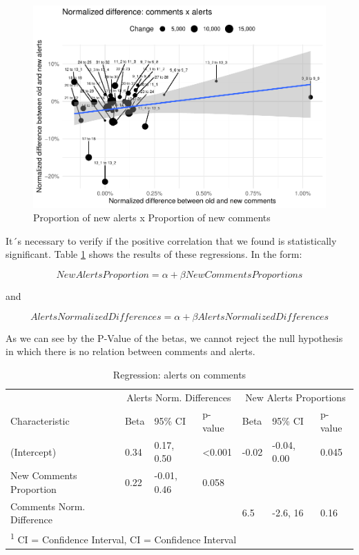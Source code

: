 \documentclass[
]{article}
\begin{document}
\begin{figure}
\centering
\includegraphics{report_files/figure-latex/unnamed-chunk-22-1.pdf}
\caption{\label{scatter_diff}Proportion of new alerts x Proportion of
new comments}
\end{figure}

\normalsize

It´s necessary to verify if the positive correlation that we found is
statistically significant. Table \ref{tab_reg} shows the results of
these regressions. In the form:

\[ NewAlertsProportion = \alpha + \beta NewCommentsProportions \]

and

\[ AlertsNormalizedDifferences = \alpha + \beta AlertsNormalizedDifferences \]

As we can see by the P-Value of the betas, we cannot reject the null
hypothesis in which there is no relation between comments and alerts.

\small

\begin{table}

\caption{\label{tab:unnamed-chunk-23}\label{tab_reg} Regression: alerts on comments}
\centering
\begin{tabular}[t]{l|l|l|l|l|l|l}
\hline
\multicolumn{1}{c|}{ } & \multicolumn{3}{c|}{Alerts Norm. Differences} & \multicolumn{3}{c}{New Alerts Proportions} \\
\cline{2-4} \cline{5-7}
Characteristic & Beta & 95\% CI & p-value & Beta & 95\% CI & p-value\\
\hline
(Intercept) & 0.34 & 0.17, 0.50 & <0.001 & -0.02 & -0.04, 0.00 & 0.045\\
\hline
New Comments Proportion & 0.22 & -0.01, 0.46 & 0.058 &  &  & \\
\hline
Comments Norm. Difference &  &  &  & 6.5 & -2.6, 16 & 0.16\\
\hline
\multicolumn{7}{l}{\textsuperscript{1} CI = Confidence Interval, CI = Confidence Interval}\\
\end{tabular}
\end{table}
\end{document}
